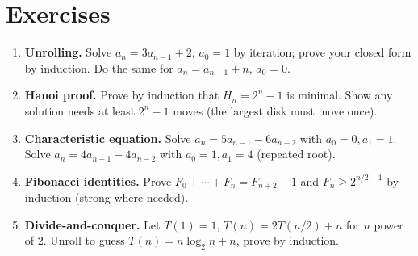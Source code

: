 \section{Exercises}
\label{sec:ch06-exercises}
\begin{enumerate}[label=E6.\arabic*, leftmargin=*, itemsep=0.6em]
\item \textbf{Unrolling.} Solve $a_n=3a_{n-1}+2$, $a_0=1$ by iteration; prove your closed form by induction. Do the same for $a_n=a_{n-1}+n$, $a_0=0$.
\item \textbf{Hanoi proof.} Prove by induction that $H_n=2^n-1$ is minimal. Show any solution needs at least $2^n-1$ moves (the largest disk must move once).
\item \textbf{Characteristic equation.} Solve $a_n=5a_{n-1}-6a_{n-2}$ with $a_0=0,a_1=1$. Solve $a_n=4a_{n-1}-4a_{n-2}$ with $a_0=1,a_1=4$ (repeated root).
\item \textbf{Fibonacci identities.} Prove $F_0+\cdots+F_n=F_{n+2}-1$ and $F_n\ge2^{n/2-1}$ by induction (strong where needed).
\item \textbf{Divide-and-conquer.} Let $T(1)=1$, $T(n)=2T(n/2)+n$ for $n$ power of $2$. Unroll to guess $T(n)=n\log_2 n+n$, prove by induction.
\end{enumerate}
